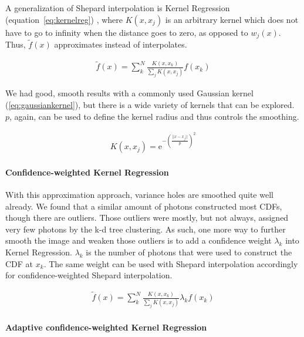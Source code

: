A generalization of Shepard interpolation is Kernel Regression (equation~\ref{eq:kernelreg}) \parencite{DBLP:conf/siggraph/AnjyoLP14}, where $K(x, x_j)$ is an arbitrary kernel which does not have to go to infinity when the distance goes to zero, as opposed to $w_j(x)$. Thus, $\widetilde{f}(x)$ approximates instead of interpolates. 

\begin{align}\label{eq:kernelreg}
\widetilde{f}(x) = \sum_{k}^{N}\frac{K(x,x_k)}{\sum\nolimits_{j}K(x, x_j)}f(x_k)
\end{align}

We had good, smooth results with a commonly used Gaussian kernel (\ref{eq:gaussiankernel}), but there is a wide variety of kernels that can be explored. $p$, again, can be used to define the kernel radius and thus controls the smoothing.

\begin{align}\label{eq:gaussiankernel}
K(x, x_j) = \mathrm{e}^{-\left(\frac{||x-x_j||}{p}\right)^2}
\end{align}

\paragraph{Confidence-weighted Kernel Regression}
\label{ch:ckernelreg}
With this approximation approach, variance holes are smoothed quite well already. We found that a similar amount of photons constructed most CDFs, though there are outliers. Those outliers were mostly, but not always, assigned very few photons by the k-d tree clustering. As such, one more way to further smooth the image and weaken those outliers is to add a confidence weight $\lambda_k$ into Kernel Regression. $\lambda_k$ is the number of photons that were used to construct the CDF at $x_k$. The same weight can be used with Shepard interpolation accordingly for confidence-weighted Shepard interpolation.

\begin{align}\label{eq:ckernelreg}
\widetilde{f}(x) = \sum_{k}^{N}\frac{K(x,x_k)}{\sum\nolimits_{j}K(x, x_j)}\lambda_kf(x_k)
\end{align}

\paragraph{Adaptive confidence-weighted Kernel Regression}
\label{ch:adckernelreg}

